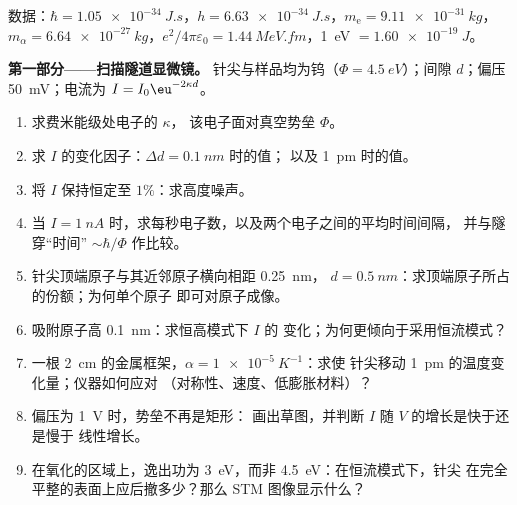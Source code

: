 \begin{problem}\label{pb:b2:potential-wells-tunneling:1}
数据：$\hbar = \qty{1.05e-34}{J.s}$，$h = \qty{6.63e-34}{J.s}$，$m_{\text{e}} =
\qty{9.11e-31}{kg}$，$m_\alpha = \qty{6.64e-27}{kg}$，$e^2/4\pi\varepsilon_0 =
\qty{1.44}{MeV.fm}$，\qty{1}{eV} $= \qty{1.60e-19}{J}$。

\textbf{第一部分——扫描隧道显微镜。}
针尖与样品均为钨（$\Phi = \qty{4.5}{eV}$）；间隙 $d$；偏压
\qty{50}{mV}；电流为 $I = I_0\eu^{-2\kappa d}$。
\begin{enumerate}
  \item 求费米能级处电子的 $\kappa$，
        该电子面对真空势垒 $\Phi$。
  \item 求 $I$ 的变化因子：$\Delta d = \qty{0.1}{nm}$ 时的值；
        以及 \qty{1}{pm} 时的值。
  \item {}将 $I$ 保持恒定至 $1\%$：求高度噪声。
  \item 当 $I = \qty{1}{nA}$ 时，求每秒电子数，以及两个电子之间的平均时间间隔，
        并与隧穿“时间” $\sim\hbar/\Phi$ 作比较。
  \item 针尖顶端原子与其近邻原子横向相距 \qty{0.25}{nm}，
        $d = \qty{0.5}{nm}$：求顶端原子所占的份额；为何单个原子
        即可对原子成像。
  \item 吸附原子高 \qty{0.1}{nm}：求恒高模式下 $I$ 的
        变化；为何更倾向于采用恒流模式？
  \item 一根 \qty{2}{cm} 的金属框架，$\alpha = \qty{1e-5}{K^{-1}}$：求使
        针尖移动 \qty{1}{pm} 的温度变化量；仪器如何应对
        （对称性、速度、低膨胀材料）？
  \item 偏压为 \qty{1}{V} 时，势垒不再是矩形：
        画出草图，并判断 $I$ 随 $V$ 的增长是快于还是慢于
        线性增长。
  \item 在氧化的区域上，逸出功为 \qty{3}{eV}，而非
        \qty{4.5}{eV}：在恒流模式下，针尖
        在完全平整的表面上应后撤多少？那么
        STM 图像显示什么？
\end{enumerate}


\end{problem}
